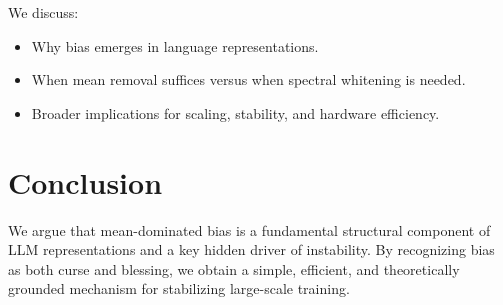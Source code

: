 We discuss:
\begin{itemize}
    \item Why bias emerges in language representations.
    \item When mean removal suffices versus when spectral whitening is needed.
    \item Broader implications for scaling, stability, and hardware efficiency.
\end{itemize}


\section{Conclusion}
\label{sec:conclusion}

We argue that mean-dominated bias is a fundamental structural component
of LLM representations and a key hidden driver of instability.
By recognizing bias as both curse and blessing, we obtain a simple,
efficient, and theoretically grounded mechanism for stabilizing
large-scale training.

\newpage





\newpage

\appendix
%

